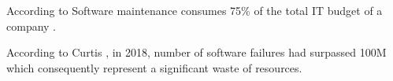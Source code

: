 % 
% 


According to Software maintenance consumes 75\% of the total IT budget of a company \cite{cisq_report}.

According to Curtis \cite{cisq_report}, in 2018, number of software failures had surpassed 100M which consequently represent a significant waste of resources. 
